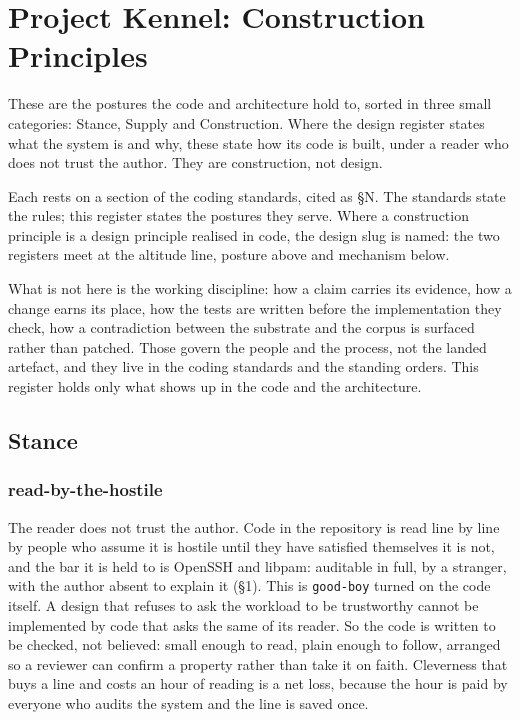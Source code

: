 \hypertarget{project-kennel-construction-principles}{%
\chapter{Project Kennel: Construction
Principles}\label{project-kennel-construction-principles}}

These are the postures the code and architecture hold to, sorted in
three small categories: Stance, Supply and Construction. Where the
design register states what the system is and why, these state how its
code is built, under a reader who does not trust the author. They are
construction, not design.

Each rests on a section of the coding standards, cited as §N. The
standards state the rules; this register states the postures they serve.
Where a construction principle is a design principle realised in code,
the design slug is named: the two registers meet at the altitude line,
posture above and mechanism below.

What is not here is the working discipline: how a claim carries its
evidence, how a change earns its place, how the tests are written before
the implementation they check, how a contradiction between the substrate
and the corpus is surfaced rather than patched. Those govern the people
and the process, not the landed artefact, and they live in the coding
standards and the standing orders. This register holds only what shows
up in the code and the architecture.

\hypertarget{stance}{%
\section{Stance}\label{stance}}

\hypertarget{read-by-the-hostile}{%
\subsection{read-by-the-hostile}\label{read-by-the-hostile}}

The reader does not trust the author. Code in the repository is read
line by line by people who assume it is hostile until they have
satisfied themselves it is not, and the bar it is held to is OpenSSH and
libpam: auditable in full, by a stranger, with the author absent to
explain it (§1). This is \texttt{good-boy} turned on the code itself. A
design that refuses to ask the workload to be trustworthy cannot be
implemented by code that asks the same of its reader. So the code is
written to be checked, not believed: small enough to read, plain enough
to follow, arranged so a reviewer can confirm a property rather than
take it on faith. Cleverness that buys a line and costs an hour of
reading is a net loss, because the hour is paid by everyone who audits
the system and the line is saved once.

